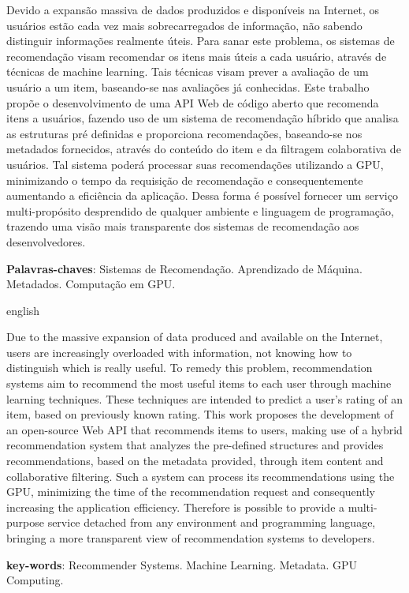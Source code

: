 \documentclass[12pt, openright, oneside, a4paper, brazil]{abntex2}
\begin{document}
\setlength{\absparsep}{18pt} %
\begin{resumo} 

Devido a expansão massiva de dados produzidos e disponíveis na Internet, os usuários estão cada vez mais sobrecarregados de informação, não sabendo distinguir informações realmente úteis. Para sanar este problema, os sistemas de recomendação visam recomendar os itens mais úteis a cada usuário, através de técnicas de machine learning. Tais técnicas visam prever a avaliação de um usuário a um item, baseando-se nas avaliações já conhecidas. Este trabalho propõe o desenvolvimento de uma API Web de código aberto que recomenda itens a usuários, fazendo uso de um sistema de recomendação híbrido que analisa as estruturas pré definidas e proporciona recomendações, baseando-se nos metadados fornecidos, através do conteúdo do item e da filtragem colaborativa de usuários. Tal sistema poderá processar suas recomendações utilizando a GPU, minimizando o tempo da requisição de recomendação e consequentemente aumentando a eficiência da aplicação. Dessa forma é possível fornecer um serviço multi-propósito desprendido de qualquer ambiente e linguagem de programação, trazendo uma visão mais transparente dos sistemas de recomendação aos desenvolvedores.

\textbf{Palavras-chaves}: Sistemas de Recomendação. Aprendizado de Máquina. Metadados. Computação em GPU.
\end{resumo}

\begin{resumo}[Abstract]
 \begin{otherlanguage*}{english}

Due to the massive expansion of data produced and available on the Internet, users are increasingly overloaded with information, not knowing how to distinguish which is really useful. To remedy this problem, recommendation systems aim to recommend the most useful items to each user through machine learning techniques. These techniques are intended to predict a user's rating of an item, based on previously known rating. This work proposes the development of an open-source Web API that recommends items to users, making use of a hybrid recommendation system that analyzes the pre-defined structures and provides recommendations, based on the metadata provided, through item content and collaborative filtering. Such a system can process its recommendations using the GPU, minimizing the time of the recommendation request and consequently increasing the application efficiency. Therefore is possible to provide a multi-purpose service detached from any environment and programming language, bringing a more transparent view of recommendation systems to developers.

  \textbf{key-words}: Recommender Systems. Machine Learning. Metadata. GPU Computing.
 \end{otherlanguage*}
\end{resumo}
\end{document}

